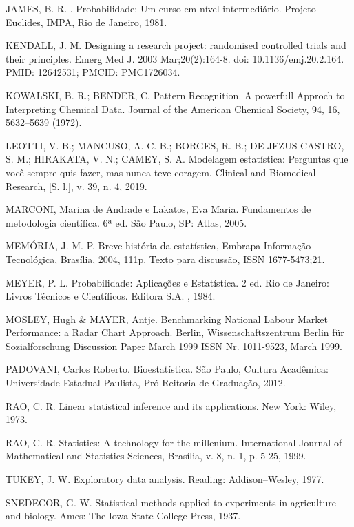 JAMES, B. R. . Probabilidade: Um curso em nível intermediário.
Projeto Euclides, IMPA, Rio de Janeiro, 1981. \vskip0.3cm


KENDALL, J. M. Designing a research project: randomised controlled trials and their principles. Emerg Med J. 2003 Mar;20(2):164-8. doi: 10.1136/emj.20.2.164. PMID: 12642531; PMCID: PMC1726034.\vskip0.3cm

KOWALSKI, B. R.; BENDER, C. Pattern Recognition. A powerfull Approch to Interpreting Chemical Data. Journal of the American Chemical Society, 94, 16, 5632–5639 (1972).\vskip0.3cm



LEOTTI, V. B.; MANCUSO, A. C. B.; BORGES, R. B.; DE JEZUS CASTRO, S. M.; HIRAKATA, V. N.; CAMEY, S. A. Modelagem estatística: Perguntas que você sempre quis fazer, mas nunca teve coragem. Clinical and Biomedical Research, [S. l.], v. 39, n. 4, 2019.\vskip0.3cm


MARCONI, Marina de Andrade e Lakatos, Eva Maria. Fundamentos de metodologia científica. 6ª ed. São Paulo, SP: Atlas, 2005.\vskip0.3cm

MEMÓRIA, J. M. P. Breve história da estatística, Embrapa Informação Tecnológica, Brasília, 2004, 111p. Texto para discussão, ISSN 1677-5473;21. \vskip0.3cm

MEYER, P. L. Probabilidade: Aplicações e Estatística. 2 ed.
Rio de Janeiro: Livros Técnicos e Científicos. Editora S.A. ,
1984.\vskip0.3cm


MOSLEY, Hugh \& MAYER, Antje. Benchmarking National Labour Market
Performance: a Radar Chart Approach. Berlin, Wissenschaftszentrum Berlin
für Sozialforschung Discussion Paper March 1999 ISSN Nr. 1011-9523, March
1999.\vskip0.3cm


PADOVANI, Carlos Roberto. Bioestatística. São Paulo, Cultura Acadêmica:
Universidade Estadual Paulista, Pró-Reitoria de Graduação, 2012.\vskip0.3cm

RAO, C. R. Linear statistical inference and its applications. New York: Wiley, 1973.\vskip0.3cm

RAO, C. R. Statistics: A technology for the millenium. International Journal of Mathematical and Statistics Sciences, Brasília, v. 8, n. 1, p. 5-25, 1999.\vskip0.3cm

TUKEY, J. W. Exploratory data analysis. Reading: Addison–Wesley, 1977.\vskip0.3cm

SNEDECOR, G. W. Statistical methods applied to experiments in agriculture and biology. Ames: The Iowa State College Press, 1937. \vskip0.3cm

